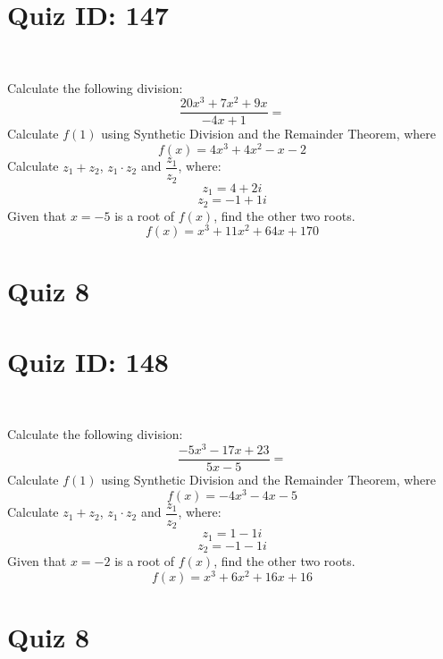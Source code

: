\documentclass{exam}
\begin{document}
\section*{Quiz ID: 147}
\vspace{0.5cm}\
\vspace{1cm}\
\begin{questions}
\question Calculate the following division:\[\dfrac{
20x^3 + 7x^2 + 9x}{
-4x + 1}=\] \makeemptybox{\stretch{2}}
\question Calculate $f(1)$ using Synthetic Division and the Remainder Theorem, where\[f(x) = 
4x^3 + 4x^2 - x - 2\]
\newpage\question Calculate $z_1+z_2$, $z_1\cdot z_2$ and $\dfrac{z_1}{z_2}$, where:\[z_1=4+2\mathit{i}\]\[z_2=-1+1\mathit{i}\]
\question Given that $x=-5$ is a root of $f(x)$, find the other two roots.\[f(x)=
x^3 + 11x^2 + 64x + 170\]\makeemptybox{\stretch{1}}
\end{questions}\newpage
\newpage
\section*{Quiz 8}
\section*{Quiz ID: 148}
\vspace{0.5cm}\
\vspace{1cm}\
\begin{questions}
\question Calculate the following division:\[\dfrac{
-5x^3 - 17x + 23}{
5x - 5}=\] 
\question Calculate $f(1)$ using Synthetic Division and the Remainder Theorem, where\[f(x) = 
-4x^3 - 4x - 5\]
\newpage\question Calculate $z_1+z_2$, $z_1\cdot z_2$ and $\dfrac{z_1}{z_2}$, where:\[z_1=1-1\mathit{i}\]\[z_2=-1-1\mathit{i}\]\makeemptybox{\stretch{1}}
\question Given that $x=-2$ is a root of $f(x)$, find the other two roots.\[f(x)=
x^3 + 6x^2 + 16x + 16\]\makeemptybox{\stretch{1}}
\end{questions}\newpage
\newpage
\section*{Quiz 8}
\end{document}
